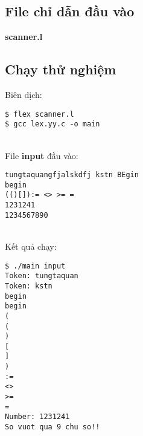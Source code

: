 \documentclass[../report.tex]{subfiles}
\begin{document}
\subsection{File chỉ dẫn đầu vào}
\textbf{scanner.l}


\subsection{Chạy thử nghiệm}
Biên dịch:
\begin{verbatim}
$ flex scanner.l
$ gcc lex.yy.c -o main
\end{verbatim}
\HRule\\
File \textbf{input} đầu vào: 
\begin{verbatim}
tungtaquangfjalskdfj kstn BEgin
begin
(()[]):= <> >= =
1231241
1234567890
\end{verbatim}
\HRule\\
Kết quả chạy: 
\begin{verbatim}
$ ./main input
Token: tungtaquan
Token: kstn
begin
begin
(
(
)
[
]
)
:=
<>
>=
=
Number: 1231241
So vuot qua 9 chu so!!
\end{verbatim}
\end{document}
